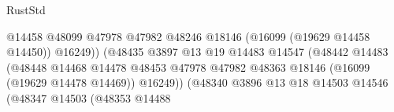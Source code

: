 \begin{lexlean}{RustStd}
\begin{coremodule}
                                                                @14458
                                                                @48099
                                                                @47978
                                                                @47982
                                                                @48246
                                                                @18146
                                                                (@16099 (@19629 @14458 @14450))
                                                                @16249))
                                                            (@48435
                                                              @3897
                                                              @13
                                                              @19
                                                              @14483
                                                              @14547
                                                              (@48442
                                                                @14483
                                                                (@48448
                                                                  @14468
                                                                  @14478
                                                                  @48453
                                                                  @47978
                                                                  @47982
                                                                  @48363
                                                                  @18146
                                                                  (@16099 (@19629 @14478 @14469))
                                                                  @16249))
                                                              (@48340
                                                                @3896
                                                                @13
                                                                @18
                                                                @14503
                                                                @14546
                                                                (@48347
                                                                  @14503
                                                                  (@48353
                                                                    @14488

\end{coremodule}
\end{lexlean}
